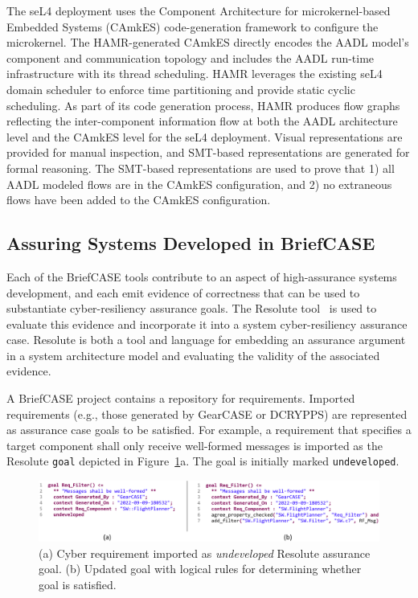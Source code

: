 The seL4 deployment uses the Component Architecture for microkernel-based Embedded Systems (CAmkES) code-generation framework to configure the microkernel. The HAMR-generated CAmkES directly encodes the AADL model’s component and communication topology and includes the AADL run-time infrastructure with its thread scheduling. HAMR leverages the existing seL4 domain scheduler to enforce time partitioning and provide static cyclic scheduling. 
%
As part of its code generation process, HAMR produces flow graphs reflecting the inter-component information flow at both the AADL architecture level and the CAmkES level for the seL4 deployment. Visual representations are provided for manual inspection, and SMT-based representations are generated for formal reasoning. The SMT-based representations are used to prove that 1) all AADL modeled flows are in the CAmkES configuration, and 2) no extraneous flows have been added to the CAmkES configuration. 


\subsection{Assuring Systems Developed in BriefCASE}

Each of the BriefCASE tools contribute to an aspect of high-assurance systems development, and each emit evidence of correctness that can be used to substantiate cyber-resiliency assurance goals. The Resolute tool~\cite{resolute2014} is used to evaluate this evidence and incorporate it into a system cyber-resiliency assurance case. 
%
Resolute is both a tool and language for embedding an assurance argument in a system architecture model and evaluating the validity of the associated evidence.

A BriefCASE project contains a repository for requirements. Imported requirements (e.g., those generated by GearCASE or DCRYPPS) are represented as assurance case goals to be satisfied. 
For example, a requirement that specifies a target component shall only receive well-formed messages is imported as the Resolute \texttt{goal} depicted in Figure~\ref{fig:resolute-requirement}a.  The goal is initially marked \texttt{undeveloped}.


\begin{figure}[h] 
	\centering 
	\includegraphics[width=\textwidth]{figs/resolute-requirement.png}
	\caption{(a) Cyber requirement imported as \textit{undeveloped} Resolute assurance goal.  (b) Updated goal with logical rules for determining whether goal is satisfied.}
	\label{fig:resolute-requirement} 
\end{figure}

